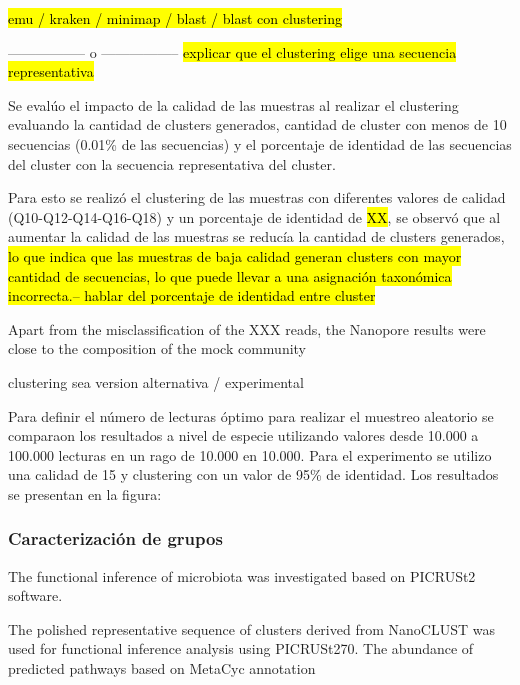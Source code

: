 \hl{emu / kraken / minimap / blast / blast con clustering}

----------------- o -----------------
\hl{explicar que el clustering elige una secuencia representativa}

Se evalúo el impacto de la calidad de las muestras al realizar el clustering evaluando la cantidad de clusters generados, cantidad de cluster con menos de 10 secuencias (0.01\% de las secuencias) y el porcentaje de identidad de las secuencias del cluster con la secuencia representativa del cluster.


Para esto se realizó el clustering de las muestras con diferentes valores de calidad (Q10-Q12-Q14-Q16-Q18) y un porcentaje de identidad de \hl{XX}, se observó que al aumentar la calidad de las muestras se reducía la cantidad de clusters generados, \hl{lo que indica que las muestras de baja calidad generan clusters con mayor cantidad de secuencias, lo que puede llevar a una asignación taxonómica incorrecta.-- hablar del porcentaje de identidad entre cluster}



Apart from the misclassification of the XXX reads, the Nanopore results were close to the composition of the mock community 

clustering sea version alternativa / experimental



Para definir el número de lecturas óptimo para realizar el muestreo aleatorio se comparaon los resultados a nivel de especie utilizando valores desde 10.000 a 100.000 lecturas en un rago de 10.000 en 10.000. 
Para el experimento se utilizo una calidad de 15 y clustering con un valor de 95\% de identidad.
Los resultados se presentan en la figura:
\subsubsection{Caracterización de grupos}
The functional inference of microbiota was investigated based on PICRUSt2 software.

The polished representative sequence of clusters derived from NanoCLUST was used for functional inference analysis using PICRUSt270. 
The abundance of predicted pathways based on MetaCyc annotation


